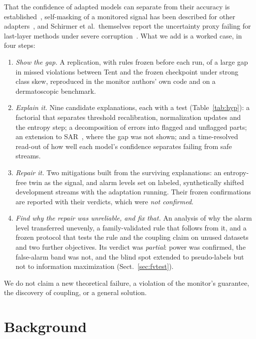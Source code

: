 \documentclass[runningheads]{llncs}
\begin{document}
That the confidence of adapted models can separate from their accuracy is established~\cite{Lee2024AETTA,Amin2025OverCertainty,Nam2026SICL}, self-masking of a monitored signal has been described for other adapters~\cite{Han2026Exchangeability}, and Schirmer et al.\ themselves report the uncertainty proxy failing for last-layer methods under severe corruption~\cite[§5.4]{Schirmer2025Monitoring}. What we add is a worked case, in four steps:
\begin{enumerate}
\item \emph{Show the gap.} A replication, with rules frozen before each run, of a large gap in missed violations between Tent and the frozen checkpoint under strong class skew, reproduced in the monitor authors' own code and on a dermatoscopic benchmark.
\item \emph{Explain it.} Nine candidate explanations, each with a test (Table~\ref{tab:hyp}): a factorial that separates threshold recalibration, normalization updates and the entropy step; a decomposition of errors into flagged and unflagged parts; an extension to SAR~\cite{Niu2023SAR}, where the gap was not shown; and a time-resolved read-out of how well each model's confidence separates failing from safe streams.
\item \emph{Repair it.} Two mitigations built from the surviving explanations: an entropy-free twin as the signal, and alarm levels set on labeled, synthetically shifted development streams with the adaptation running. Their frozen confirmations are reported with their verdicts, which were \emph{not confirmed}.
\item \emph{Find why the repair was unreliable, and fix that.} An analysis of why the alarm level transferred unevenly, a family-validated rule that follows from it, and a frozen protocol that tests the rule and the coupling claim on unused datasets and two further objectives. Its verdict was \emph{partial}: power was confirmed, the false-alarm band was not, and the blind spot extended to pseudo-labels but not to information maximization (Sect.~\ref{sec:fvtest}).
\end{enumerate}
We do not claim a new theoretical failure, a violation of the monitor's guarantee, the discovery of coupling, or a general solution.

\section{Background}
\end{document}

